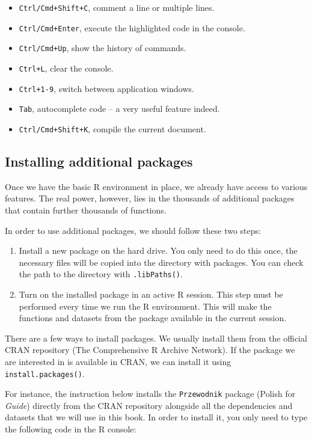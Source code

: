\documentclass[]{book}
\theoremstyle{definition}
\theoremstyle{definition}
\theoremstyle{definition}
\theoremstyle{remark}
\begin{document}
\begin{itemize}
\item
  \texttt{Ctrl/Cmd+Shift+C}, comment a line or multiple lines.
\item
  \texttt{Ctrl/Cmd+Enter}, execute the highlighted code in the console.
\item
  \texttt{Ctrl/Cmd+Up}, show the history of commands.
\item
  \texttt{Ctrl+L}, clear the console.
\item
  \texttt{Ctrl+1-9}, switch between application windows.
\item
  \texttt{Tab}, autocomplete code -- a very useful feature indeed.
\item
  \texttt{Ctrl/Cmd+Shift+K}, compile the current document.
\end{itemize}

\subsection{Installing additional packages}\label{part_133}

Once we have the basic R environment in place, we already have access to
various features. The real power, however, lies in the thousands of
additional packages that contain further thousands of functions.

In order to use additional packages, we should follow these two steps:

\begin{enumerate}
\def\labelenumi{\arabic{enumi}.}
\item
  Install a new package on the hard drive. You only need to do this
  once, the necessary files will be copied into the directory with
  packages. You can check the path to the directory with
  \texttt{.libPaths()}.
\item
  Turn on the installed package in an active R session. This step must
  be performed every time we run the R environment. This will make the
  functions and datasets from the package available in the current
  session.
\end{enumerate}

There are a few ways to install packages. We usually install them from
the official CRAN repository (The Comprehensive R Archive Network). If
the package we are interested in is available in CRAN, we can install it
using \texttt{install.packages()}.

For instance, the instruction below installs the \texttt{Przewodnik}
package (Polish for \emph{Guide}) directly from the CRAN repository
alongside all the dependencies and datasets that we will use in this
book. In order to install it, you only need to type the following code
in the R console:
\end{document}
